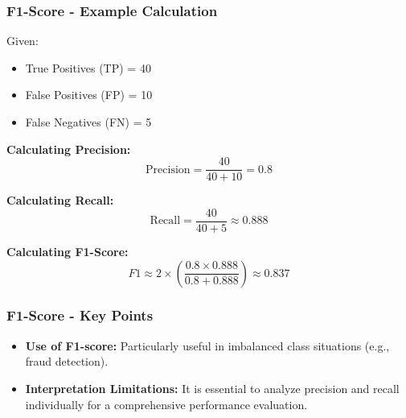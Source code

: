\documentclass[aspectratio=169]{beamer}
\begin{document}
\begin{frame}[fragile]
    \frametitle{F1-Score - Example Calculation}
    Given:
    \begin{itemize}
        \item True Positives (TP) = 40  
        \item False Positives (FP) = 10  
        \item False Negatives (FN) = 5  
    \end{itemize}
    
    \textbf{Calculating Precision:}
    \begin{equation}
        \text{Precision} = \frac{40}{40 + 10} = 0.8
    \end{equation}

    \textbf{Calculating Recall:}
    \begin{equation}
        \text{Recall} = \frac{40}{40 + 5} \approx 0.888
    \end{equation}

    \textbf{Calculating F1-Score:}
    \begin{equation}
        F1 \approx 2 \times \left( \frac{0.8 \times 0.888}{0.8 + 0.888} \right) \approx 0.837
    \end{equation}
\end{frame}

\begin{frame}[fragile]
    \frametitle{F1-Score - Key Points}
    \begin{itemize}
        \item \textbf{Use of F1-score:} Particularly useful in imbalanced class situations (e.g., fraud detection).
        \item \textbf{Interpretation Limitations:} It is essential to analyze precision and recall individually for a comprehensive performance evaluation.
    \end{itemize}
\end{frame}
\end{document}
